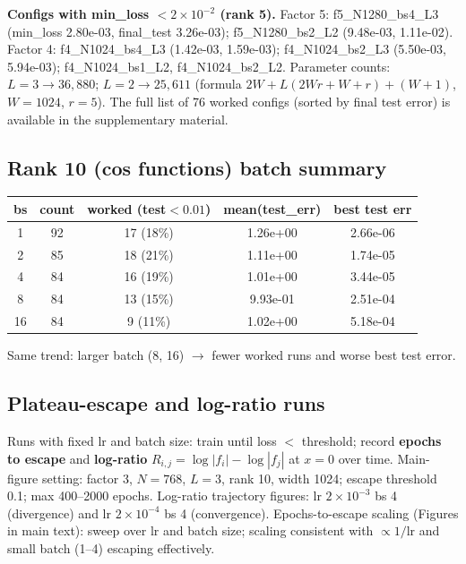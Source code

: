 \documentclass{article}
\theoremstyle{plain}
\theoremstyle{definition}
\begin{document}
\textbf{Configs with min\_loss $< 2{\times}10^{-2}$ (rank 5).} Factor 5: f5\_N1280\_bs4\_L3 (min\_loss 2.80e-03, final\_test 3.26e-03); f5\_N1280\_bs2\_L2 (9.48e-03, 1.11e-02). Factor 4: f4\_N1024\_bs4\_L3 (1.42e-03, 1.59e-03); f4\_N1024\_bs2\_L3 (5.50e-03, 5.94e-03); f4\_N1024\_bs1\_L2, f4\_N1024\_bs2\_L2. Parameter counts: $L{=}3 \to 36{,}880$; $L{=}2 \to 25{,}611$ (formula $2W + L(2Wr+W+r) + (W+1)$, $W{=}1024$, $r{=}5$). The full list of 76 worked configs (sorted by final test error) is available in the supplementary material.

\subsection{Rank 10 (cos functions) batch summary}
\begin{center}
\small
\begin{tabular}{@{}ccccc@{}}
\toprule
bs & count & worked (test$<0.01$) & mean(test\_err) & best test err \\
\midrule
1 & 92 & 17 (18\%) & 1.26e+00 & 2.66e-06 \\
2 & 85 & 18 (21\%) & 1.11e+00 & 1.74e-05 \\
4 & 84 & 16 (19\%) & 1.01e+00 & 3.44e-05 \\
8 & 84 & 13 (15\%) & 9.93e-01 & 2.51e-04 \\
16 & 84 & 9 (11\%) & 1.02e+00 & 5.18e-04 \\
\bottomrule
\end{tabular}
\end{center}
Same trend: larger batch (8, 16) $\to$ fewer worked runs and worse best test error.

\subsection{Plateau-escape and log-ratio runs}
\label{app:plateau-logratio}

Runs with fixed lr and batch size: train until loss $<$ threshold; record \textbf{epochs to escape} and \textbf{log-ratio} $R_{i,j}=\log|f_i|-\log|f_j|$ at $x=0$ over time. Main-figure setting: factor 3, $N=768$, $L=3$, rank 10, width 1024; escape threshold 0.1; max 400--2000 epochs. Log-ratio trajectory figures: lr $2{\times}10^{-3}$ bs 4 (divergence) and lr $2{\times}10^{-4}$ bs 4 (convergence). Epochs-to-escape scaling (Figures in main text): sweep over lr and batch size; scaling consistent with $\propto 1/\mathrm{lr}$ and small batch (1--4) escaping effectively.
\end{document}
